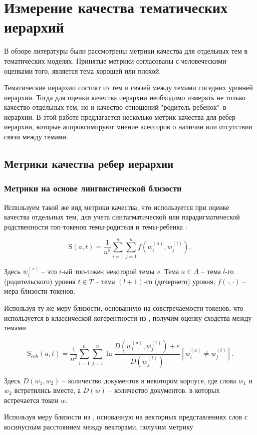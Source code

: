 \chapter{Измерение качества тематических иерархий}
В обзоре литературы были рассмотрены метрики качества для отдельных тем в тематических моделях. Принятые метрики согласованы с человеческими оценками того, является тема хорошей или плохой.

Тематические иерархии состоят из тем и связей между темами соседних уровней иерархии. Тогда для оценки качества иерархии необходимо измерять не только качество отдельных тем, но и качество отношений "родитель-ребенок"\ в иерархии. В этой работе предлагается несколько метрик качества для ребер иерархии, которые аппроксимируют мнение асессоров о наличии или отсутствии связи между темами.  

\section{Метрики качества ребер иерархии}
\subsection{Метрики на основе лингвистической близости}
 Используем такой же вид метрики качества, что используется при оценке качества отдельных тем, для учета синтагматической или парадигматической родственности топ-токенов темы-родителя и темы-ребенка \cite{Schutze1993}:

$$\mathrm{S}(a, t) = \dfrac{1}{n^2}\sum\limits_{i=1}^{n}\sum\limits_{j=1}^n f(w_i^{(a)}, w_j^{(t)}),$$

Здесь $w_i^{(s)}$ -- это $i$-ый топ-токен некоторой темы $s$. Тема $a \in A$ -- тема $l$-го (родительского) уровня $t\in T$ -- тема $(l+1)$-го (дочернего) уровня, $f(\cdot, \cdot)$ -- мера близости токенов.

Используя ту же меру близости, основанную на совстречаемости токенов, что используется в классической когерентности из \cite{Mimno2011}, получим оценку сходства между темами 

$$\mathrm{S}_{coh}(a, t) = \dfrac{1}{n^2}\sum\limits_{i=1}^n \sum\limits_{j=1}^n \ln \dfrac{D(w^{(a)}_i, w^{(t)}_j) + \varepsilon}{D(w^{(t)}_j)}[w_i^{(a)} \neq w_j^{(t)}].$$ 

Здесь $D(w_1, w_2)$ -- количество документов в некотором корпусе, где слова $w_1$ и $w_2$ встретились вместе, а $D(w)$ -- количество документов, в которых встречается токен $w$.

Используя меру близости из \cite{Nikolenko2016}, основанную на векторных представлениях слов с косинусным расстоянием между векторами, получим метрику 

